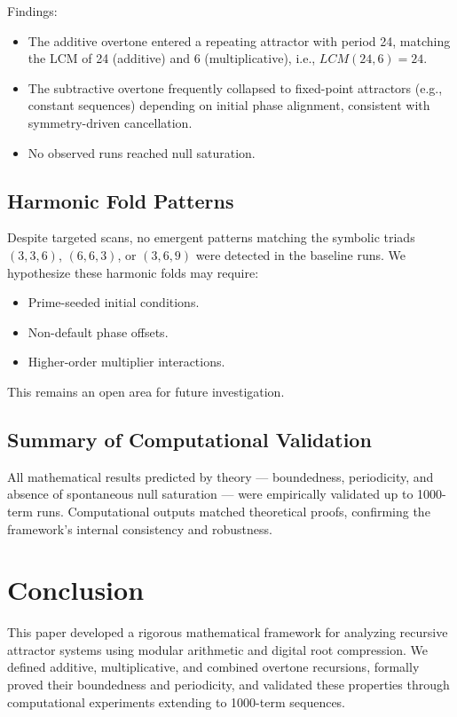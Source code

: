 \documentclass[12pt]{article}
\begin{document}
Findings:
\begin{itemize}
    \item The additive overtone entered a repeating attractor with period 24, matching the LCM of 24 (additive) and 6 (multiplicative), i.e., \( LCM(24,6) = 24 \).
    \item The subtractive overtone frequently collapsed to fixed-point attractors (e.g., constant sequences) depending on initial phase alignment, consistent with symmetry-driven cancellation.
    \item No observed runs reached null saturation.
\end{itemize}

\subsection{Harmonic Fold Patterns}

Despite targeted scans, no emergent patterns matching the symbolic triads \( (3,3,6) \), \( (6,6,3) \), or \( (3,6,9) \) were detected in the baseline runs. We hypothesize these harmonic folds may require:
\begin{itemize}
    \item Prime-seeded initial conditions.
    \item Non-default phase offsets.
    \item Higher-order multiplier interactions.
\end{itemize}
This remains an open area for future investigation.

\subsection{Summary of Computational Validation}

All mathematical results predicted by theory — boundedness, periodicity, and absence of spontaneous null saturation — were empirically validated up to 1000-term runs. Computational outputs matched theoretical proofs, confirming the framework’s internal consistency and robustness.

\section{Conclusion}

This paper developed a rigorous mathematical framework for analyzing recursive attractor systems using modular arithmetic and digital root compression. We defined additive, multiplicative, and combined overtone recursions, formally proved their boundedness and periodicity, and validated these properties through computational experiments extending to 1000-term sequences.
\end{document}
